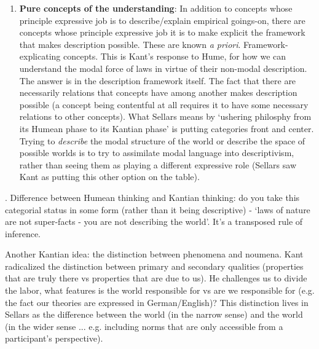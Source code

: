 \documentclass[12pt,a4paper]{report}
\begin{document}
\begin{enumerate}
\item \textbf{Pure concepts of the understanding}: In addition to concepts whose principle expressive job is to describe/explain empirical goings-on, there are concepts whose principle expressive job it is to make explicit the framework that makes description possible. These are known \textit{a priori}. Framework-explicating concepts. This is Kant's response to Hume, for how we can understand the modal force of laws in virtue of their non-modal description. The answer is in the description framework itself. The fact that there are necessarily relations that concepts have among another makes description possible (a concept being contentful at all requires it to have some necessary relations to other concepts). What Sellars means by `ushering philosphy from its Humean phase to its Kantian phase' is putting categories front and center. Trying to \emph{describe} the modal structure of the world or describe the space of possible worlds is to try to assimilate modal language into descriptivism, rather than seeing them as playing a different expressive role (Sellars saw Kant as putting this other option on the table).
\end{enumerate}. Difference between Humean thinking and Kantian thinking: do you take this categorial status in some form (rather than it being descriptive) - `laws of nature are not super-facts - you are not describing the world'. It's a transposed rule of inference.

Another Kantian idea: the distinction between phenomena and noumena. Kant radicalized the distinction between primary and secondary qualities (properties that are truly there vs properties that are due to us). He challenges us to divide the labor, what features is the world responsible for vs are we responsible for (e.g. the fact our theories are expressed in German/English)? This distinction lives in Sellars as the difference between the world (in the narrow sense) and the world (in the wider sense ... e.g. including norms that are only accessible from a participant's perspective).
\end{document}
